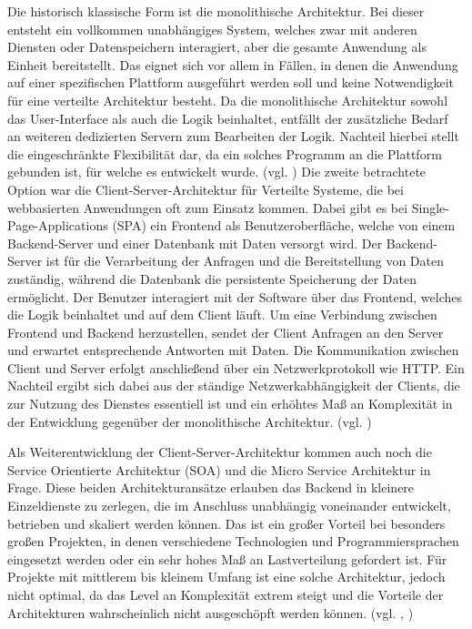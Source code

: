 Die historisch klassische Form ist die monolithische Architektur. Bei dieser entsteht ein vollkommen unabhängiges System, welches zwar mit anderen Diensten oder Datenspeichern interagiert, aber die gesamte Anwendung als Einheit bereitstellt. Das eignet sich vor allem in Fällen, in denen die Anwendung auf einer spezifischen Plattform ausgeführt werden soll und keine Notwendigkeit für eine verteilte Architektur besteht. Da die monolithische Architektur sowohl das User-Interface als auch die Logik beinhaltet, entfällt der zusätzliche Bedarf an weiteren dedizierten Servern zum Bearbeiten der Logik. Nachteil hierbei stellt die eingeschränkte Flexibilität dar, da ein solches Programm an die Plattform gebunden ist, für welche es entwickelt wurde. (vgl. \cite{Architekturen})
Die zweite betrachtete Option war die Client-Server-Architektur für Verteilte Systeme, die bei webbasierten Anwendungen oft zum Einsatz kommen. Dabei gibt es \zB bei Single-Page-Applications (SPA) ein Frontend als Benutzeroberfläche, welche von einem Backend-Server und einer Datenbank mit Daten versorgt wird. Der Backend-Server ist für die Verarbeitung der Anfragen und die Bereitstellung von Daten zuständig, während die Datenbank die persistente Speicherung der Daten ermöglicht. Der Benutzer interagiert mit der Software über das Frontend, welches die Logik beinhaltet und auf dem Client läuft. Um eine Verbindung zwischen Frontend und Backend herzustellen, sendet der Client Anfragen an den Server und erwartet entsprechende Antworten mit Daten. Die Kommunikation zwischen Client und Server erfolgt anschließend über ein Netzwerkprotokoll wie HTTP. Ein Nachteil ergibt sich dabei aus der ständige Netzwerkabhängigkeit der Clients, die zur Nutzung des Dienstes essentiell ist und ein erhöhtes Maß an Komplexität in der Entwicklung gegenüber der monolithische Architektur. (vgl. \cite{SPA})

Als Weiterentwicklung der Client-Server-Architektur kommen auch noch die Service Orientierte Architektur (SOA) und die Micro Service Architektur in Frage. Diese beiden Architekturansätze erlauben das Backend in kleinere Einzeldienste zu zerlegen, die im Anschluss unabhängig voneinander entwickelt, betrieben und skaliert werden können. Das ist ein großer Vorteil bei besonders großen Projekten, in denen verschiedene Technologien und Programmiersprachen eingesetzt werden oder ein sehr hohes Maß an Lastverteilung gefordert ist. Für Projekte mit mittlerem bis kleinem Umfang ist eine solche Architektur, jedoch nicht optimal, da das Level an Komplexität extrem steigt und die Vorteile der Architekturen wahrscheinlich nicht ausgeschöpft werden können. (vgl. \cite{SOA}, \cite{Micro})

